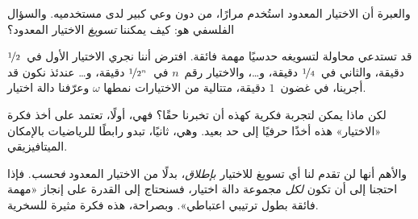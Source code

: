 \documentclass[../../../include/open-logic-section]{subfiles}
\begin{document}
والعبرة أن الاختيار المعدود استُخدم مرارًا، من دون وعي كبير لدى
مستخدميه. والسؤال الفلسفي هو: كيف يمكننا \emph{تسويغ} الاختيار
المعدود؟

قد تستدعي محاولة لتسويغه حدسيًا مهمة فائقة. افترض أننا نجري الاختيار
الأول في~$\nicefrac{1}{2}$ دقيقة، والثاني في~$\nicefrac{1}{4}$ دقيقة،
و\dots، والاختيار رقم~$n$ في~$\nicefrac{1}{2^n}$ دقيقة، و\dots\@
عندئذ نكون قد أجرينا، في غضون~$1$ دقيقة، متتالية من الاختيارات نمطها
$\omega$ وعرّفنا دالة اختيار.

لكن ماذا يمكن لتجربة فكرية كهذه أن تخبرنا حقًا؟ فهي، أولًا، تعتمد
على أخذ فكرة «الاختيار» هذه أخذًا حرفيًا إلى حد بعيد. وهي، ثانيًا،
تبدو رابطًا للرياضيات بالإمكان الميتافيزيقي.

والأهم أنها لن تقدم لنا أي تسويغ للاختيار \emph{بإطلاق}، بدلًا من
الاختيار المعدود \emph{فحسب}. فإذا احتجنا إلى أن تكون \emph{لكل}
مجموعة دالة اختيار، فسنحتاج إلى القدرة على إنجاز «مهمة فائقة بطول
ترتيبي اعتباطي». وبصراحة، هذه فكرة مثيرة للسخرية.
\end{document}
